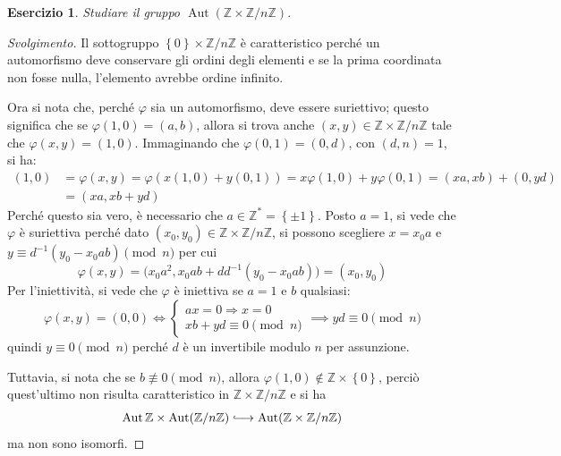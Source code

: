 \documentclass[12pt]{scrartcl}
\theoremstyle{style}
\newtheorem{esercizio}{Esercizio}[section]
\newenvironment{svolgimento}{\renewcommand\qedsymbol{$\blacksquare$}\begin{proof}[Svolgimento]}{\end{proof}}
\numberwithin{equation}{subsection}
\newcommand{\longhookrightarrow}{\lhook\joinrel\longrightarrow}
\begin{document}
\begin{esercizio}
Studiare il gruppo $\operatorname{Aut} ( \mathbb{Z}\times \mathbb{Z}/n\mathbb{Z})$.
\end{esercizio}
\begin{svolgimento}
	Il sottogruppo $\left\{ 0 \right\} \times \mathbb{Z}/n\mathbb{Z}$ \`e caratteristico perch\'e un automorfismo deve conservare gli ordini degli elementi e se la prima coordinata non fosse nulla, l'elemento avrebbe ordine infinito.

	Ora si nota che, perch\'e $\varphi $ sia un automorfismo, deve essere suriettivo; questo significa che se $\varphi (1,0) = (a,b)$, allora si trova anche $(x,y) \in \mathbb{Z}\times \mathbb{Z}/n\mathbb{Z}$ tale che $\varphi (x,y) = (1,0)$. Immaginando che $\varphi (0,1) = (0,d)$, con $(d,n) = 1$, si ha:
	\[
		\begin{split}
			(1,0) &= \varphi (x,y) = \varphi (x (1,0) + y (0,1)) = x\varphi (1,0) + y \varphi (0,1) = (xa,xb) + (0,yd)\\
													       &= (xa, xb + yd)
		\end{split}
	\] 
	Perch\'e questo sia vero, \`e necessario che $a \in \mathbb{Z}^* = \left\{ \pm 1 \right\} $.
Posto $a = 1$, si vede che $\varphi $ \`e suriettiva perch\'e dato $(x_0,y_0) \in \mathbb{Z}\times \mathbb{Z}/n\mathbb{Z}$, si possono scegliere $x = x_0 a$ e $y \equiv d^{-1}(y_0 - x_0 ab)\pmod{n} $ per cui
\[
\varphi (x,y) = \big(x_0a^{2} ,x_0 ab +dd^{-1}(y_0-x_0ab)\big)=(x_0,y_0)
\] 
	Per l'iniettivit\`a, si vede che $\varphi $ \`e iniettiva se $a=1$ e $b$ qualsiasi:
	\[
	\varphi (x,y) = (0,0) \iff \begin{cases}
		ax = 0\Rightarrow x=0 \\
		xb + yd \equiv 0 \pmod{n} 
	\end{cases}\implies yd \equiv 0 \pmod{n}
	\] 
	quindi $y \equiv 0 \pmod{n} $ perch\'e $d$ \`e un invertibile modulo $n$ per assunzione.

	Tuttavia, si nota che se $b \not \equiv 0 \pmod{n} $, allora $\varphi (1,0)\not\in \mathbb{Z}\times \left\{ 0 \right\} $, perci\`o quest'ultimo non risulta caratteristico in $\mathbb{Z}\times \mathbb{Z}/n\mathbb{Z}$ e si ha 
	\[
	\operatorname{Aut} \mathbb{Z} \times \operatorname{Aut} (\mathbb{Z}/n\mathbb{Z}) \longhookrightarrow \operatorname{Aut} (\mathbb{Z}\times \mathbb{Z}/n\mathbb{Z})
	\] 
	ma non sono isomorfi.
\end{svolgimento}
\end{document}
